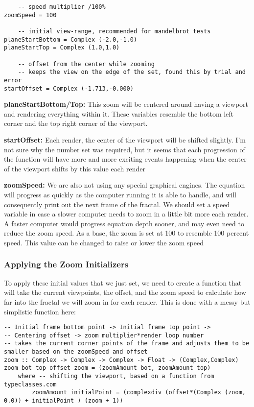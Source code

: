 \documentclass{article}
\begin{document}
    \begin{lstlisting}
    -- speed multiplier /100%
zoomSpeed = 100

    -- initial view-range, recommended for mandelbrot tests
planeStartBottom = Complex (-2.0,-1.0)
planeStartTop = Complex (1.0,1.0)

    -- offset from the center while zooming
    -- keeps the view on the edge of the set, found this by trial and error
startOffset = Complex (-1.713,-0.000)
    \end{lstlisting}
    
    \medskip\noindent
    \textbf{planeStartBottom/Top:} This zoom will be centered around having a viewport and rendering everything within it. These variables resemble the bottom left corner and the top right corner of the viewport.
    
    \smallskip\noindent
    \textbf{startOffset:} Each render, the center of the viewport will be shifted slightly. I'm not sure why the number set was required, but it seems that each progression of the function will have more and more exciting events happening when the center of the viewport shifts by this value each render
    
    \smallskip\noindent
    \textbf{zoomSpeed:} We are also not using any special graphical engines. The equation will progress as quickly as the computer running it is able to handle, and will consequently print out the next frame of the fractal. We should set a speed variable in case a slower computer needs to zoom in a little bit more each render. A faster computer would progress equation depth sooner, and may even need to reduce the zoom speed. As a base, the zoom is set at 100 to resemble 100 percent speed. This value can be changed to raise or lower the zoom speed
    
    \subsubsection{Applying the Zoom Initializers}
    To apply these initial values that we just set, we need to create a function that will take the current viewpoints, the offset, and the zoom speed to calculate how far into the fractal we will zoom in for each render. This is done with a messy but simplistic function here:
    
    \begin{lstlisting}
-- Initial frame bottom point -> Initial frame top point ->
-- Centering offset -> zoom multiplier*render loop number
-- takes the current corner points of the frame and adjusts them to be smaller based on the zoomSpeed and offset
zoom :: Complex -> Complex -> Complex -> Float -> (Complex,Complex)
zoom bot top offset zoom = (zoomAmount bot, zoomAmount top)
    where -- shifting the viewport, based on a function from typeclasses.com
        zoomAmount initialPoint = (complexdiv (offset*(Complex (zoom, 0.0)) + initialPoint ) (zoom + 1))
    \end{lstlisting}
    
\end{document}
